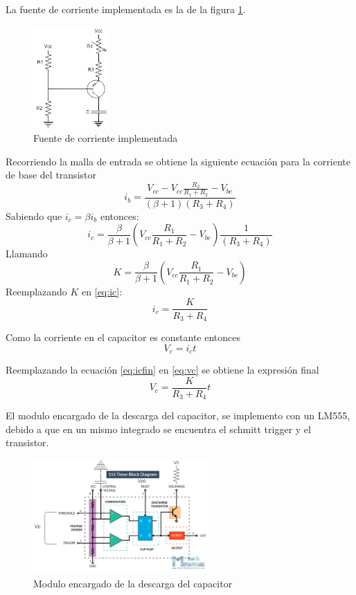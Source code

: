 \documentclass[../../ASSD_TP1_G7.tex]{subfiles}
\begin{document}
La fuente de corriente implementada es la de la figura \ref{fig:fuenteCorriente}. 
\begin{figure}[H]
\centering
\includegraphics[width=0.25\textwidth]{figures/fCorriente.png}
\caption{Fuente de corriente implementada}\label{fig:fuenteCorriente}
\end{figure}
Recorriendo la malla de entrada se obtiene la siguiente ecuación para la corriente de base del transistor
\begin{equation}
i_b=\frac{V_{cc}-V_{cc}\frac{R_2}{R_1 + R_2}-V_{be}}{(\beta + 1)(R_3 + R_4)}
\end{equation}
Sabiendo que $i_c=\beta i_b$ entonces:
\begin{equation}
i_c= \frac{\beta}{\beta + 1} \left( V_{cc} \frac{R_1}{R_1 + R_2} -V_{be} \right) \frac{1}{(R_3 + R_4)} \label{eq:ic}
\end{equation}
Llamando 
\begin{equation}
K=\frac{\beta}{\beta + 1} \left( V_{cc} \frac{R_1}{R_1 + R_2} -V_{be} \right)
\end{equation}
Reemplazando $K$ en \ref{eq:ic}:
\begin{equation}
i_c=\frac{K}{R_3 + R_4} \label{eq:icfin}
\end{equation}

Como la corriente en el capacitor es constante entonces
\begin{equation}
V_c=i_c t \label{eq:vc}
\end{equation}

Reemplazando la ecuación \ref{eq:icfin} en \ref{eq:vc} se obtiene la expresión final
\begin{equation}
V_c=\frac{K}{R_3 + R_4} t 
\end{equation}

\par El modulo encargado de la descarga del capacitor, se implemento con un LM555, debido a que en un mismo integrado se encuentra el schmitt trigger y el transistor.
\begin{figure}[H]
\centering
\includegraphics[width=0.6\textwidth]{figures/descargaC.png}
\caption{Modulo encargado de la descarga del capacitor}\label{fig:descargac}
\end{figure}
\end{document}
